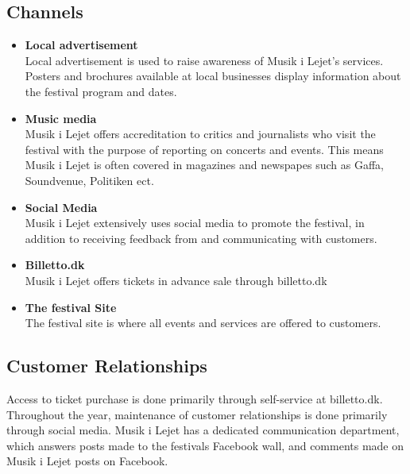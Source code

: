 \subsection{Channels} %
\label{sub:channels}
\begin{itemize}
	\item \textbf{Local advertisement}\\
		Local advertisement is used to raise awareness of Musik i Lejet's services. Posters and brochures available at local businesses display information about the festival program and dates.
	\item \textbf{Music media}\\
		Musik i Lejet offers accreditation to critics and journalists who visit the festival with the purpose of reporting on concerts and events. This means Musik i Lejet is often covered in magazines and newspapes such as Gaffa, Soundvenue, Politiken ect.
	\item \textbf{Social Media}\\
		Musik i Lejet extensively uses social media to promote the festival, in addition to receiving feedback from and communicating with customers.
	\item \textbf{Billetto.dk}\\
		Musik i Lejet offers tickets in advance sale through billetto.dk
	\item \textbf{The festival Site}\\
		The festival site is where all events and services are offered to customers. 
\end{itemize}
\subsection{Customer Relationships} %
\label{sub:customer_relationships}
Access to ticket purchase is done primarily through self-service at billetto.dk. Throughout the year, maintenance of customer relationships is done primarily through social media. Musik i Lejet has a dedicated communication department, which answers posts made to the festivals Facebook wall, and comments made on Musik i Lejet posts on Facebook.

